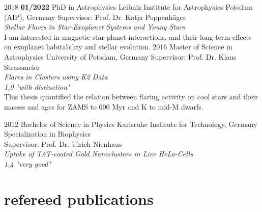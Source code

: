 \documentclass[]{k-cv} %
\begin{document}
\begin{entrylist}
\entry
{2018 \to \textbf{01/2022}}
{PhD {\normalfont in Astrophysics}}
{Leibniz Institute for Astrophysics Potsdam (AIP), Germany}
{Supervisor: Prof. Dr. Katja Poppenh\"ager\\
\emph{Stellar Flares in Star-Exoplanet Systems and Young Stars} \vspace{0.2cm}\\ I am interested in magnetic star-planet interactions, and their long-term effects on exoplanet habitability and stellar evolution.}
\entry
{2016 }
{Master {\normalfont of Science in Astrophysics}}
{University of Potsdam, Germany}
{Supervisor: Prof. Dr. Klaus Strassmeier\\
\emph{Flares in Clusters using K2 Data} \\ 
\emph{1,0 "with distinction"}\vspace{0.2cm}\\
This thesis quantified the relation between flaring activity on cool stars and their masses and ages for ZAMS to 600 Myr and K to mid-M dwarfs.}


\entry
{2012 }
{Bachelor {\normalfont of Science in Physics}}
{Karlsruhe Institute for Technology, Germany}
{Specialization in Biophysics\\
Supervisor: Prof. Dr. Ulrich Nienhaus\\
\emph{Uptake of TAT-coated Gold Nanoclusters in Live HeLa-Cells}\\
\emph{1,4 "very good"}}
\end{entrylist}



\section{refereed publications}
\end{document}
